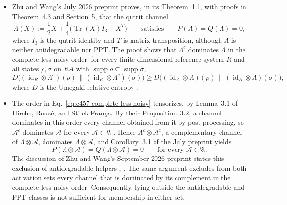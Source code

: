 \begin{itemize}
  \item Zhu and Wang's July 2026 preprint proves, in its Theorem~1.1, with proofs in Theorem~4.3 and Section~5, that the qutrit channel
\begin{equation}
 \Lambda(X):=\frac12X+\frac14\bigl(\operatorname{Tr}(X)I_3-X^{T}\bigr)
 \qquad\text{satisfies}\qquad
 P(\Lambda)=Q(\Lambda)=0,
 \label{eq:c457-qutrit-channel}
\end{equation}
where $I_3$ is the qutrit identity and $T$ is matrix transposition, although $\Lambda$ is neither antidegradable nor PPT. The proof shows that $\Lambda^c$ dominates $\Lambda$ in the complete less-noisy order: for every finite-dimensional reference system $R$ and all states $\rho,\sigma$ on $RA$ with $\operatorname{supp}\rho\subseteq\operatorname{supp}\sigma$,
\begin{equation}
 D\bigl((\operatorname{id}_R\otimes\Lambda^c)(\rho)\,\big\|\,(\operatorname{id}_R\otimes\Lambda^c)(\sigma)\bigr)
 \geq
 D\bigl((\operatorname{id}_R\otimes\Lambda)(\rho)\,\big\|\,(\operatorname{id}_R\otimes\Lambda)(\sigma)\bigr),
 \label{eq:c457-complete-less-noisy}
\end{equation}
where $D$ is the Umegaki relative entropy .

  \item The order in Eq.~\eqref{eq:c457-complete-less-noisy} tensorizes, by Lemma~3.1 of Hirche, Rouz\'e, and Stilck Fran\c{c}a. By their Proposition~3.2, a channel dominates in this order every channel obtained from it by post-processing, so $\mathcal A^c$ dominates $\mathcal A$ for every $\mathcal A\in\mathfrak A$ . Hence $\Lambda^c\otimes\mathcal A^c$, a complementary channel of $\Lambda\otimes\mathcal A$, dominates $\Lambda\otimes\mathcal A$, and Corollary~3.1 of the July preprint yields
\begin{equation}
 P(\Lambda\otimes\mathcal A)=Q(\Lambda\otimes\mathcal A)=0
 \qquad\text{for every }\mathcal A\in\mathfrak A.
 \label{eq:c457-qutrit-obstruction}
\end{equation}
The discussion of Zhu and Wang's September 2026 preprint states this exclusion of antidegradable helpers , . The same argument excludes from both activation sets every channel that is dominated by its complement in the complete less-noisy order. Consequently, lying outside the antidegradable and PPT classes is not sufficient for membership in either set.


\end{itemize}
